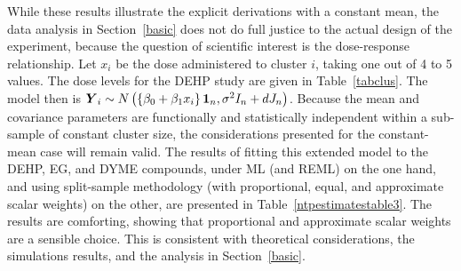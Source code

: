 \documentclass[11pt,a5paper,twoside]{book}
\newcommand{\BY}{\mbox{\boldmath $Y$}}
\begin{document}
While these results illustrate the explicit derivations  with a constant mean, the data analysis in Section~\ref{basic} 
does not do full justice to the actual design of the experiment, because the question of  scientific interest is the 
dose-response relationship. Let $x_i$ be the dose administered to 
cluster $i$, taking one out of 4 to 5 values. The dose 
levels for the DEHP study are given in Table~\ref{tabclus}. The model 
then is $\BY_i\sim N\left(\left\{\beta_0+\beta_1x_i\right\}\mathbf{1}_n,\sigma^2 I_{n}+d J_{n}\right)$. 
Because the mean and covariance parameters are functionally and 
statistically independent within a sub-sample of constant cluster size, 
the considerations presented for the constant-mean case will remain valid. 
The results of fitting this extended model to the DEHP, EG, and DYME compounds, 
under ML (and REML) on the one hand, and using split-sample methodology 
(with proportional, equal, and approximate scalar weights) on the other, 
are presented in Table~\ref{ntpestimatestable3}. The results are  
comforting, showing that proportional and approximate scalar weights are a sensible choice. This is consistent with theoretical considerations, 
the simulations results, and the analysis in Section~\ref{basic}.
\end{document}
